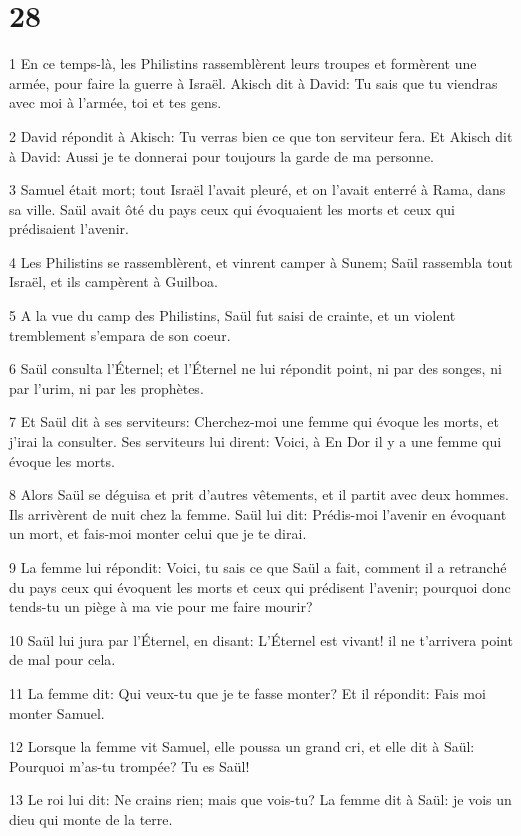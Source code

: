 \chapter{28}

\par 1 En ce temps-là, les Philistins rassemblèrent leurs troupes et formèrent une armée, pour faire la guerre à Israël. Akisch dit à David: Tu sais que tu viendras avec moi à l'armée, toi et tes gens.
\par 2 David répondit à Akisch: Tu verras bien ce que ton serviteur fera. Et Akisch dit à David: Aussi je te donnerai pour toujours la garde de ma personne.
\par 3 Samuel était mort; tout Israël l'avait pleuré, et on l'avait enterré à Rama, dans sa ville. Saül avait ôté du pays ceux qui évoquaient les morts et ceux qui prédisaient l'avenir.
\par 4 Les Philistins se rassemblèrent, et vinrent camper à Sunem; Saül rassembla tout Israël, et ils campèrent à Guilboa.
\par 5 A la vue du camp des Philistins, Saül fut saisi de crainte, et un violent tremblement s'empara de son coeur.
\par 6 Saül consulta l'Éternel; et l'Éternel ne lui répondit point, ni par des songes, ni par l'urim, ni par les prophètes.
\par 7 Et Saül dit à ses serviteurs: Cherchez-moi une femme qui évoque les morts, et j'irai la consulter. Ses serviteurs lui dirent: Voici, à En Dor il y a une femme qui évoque les morts.
\par 8 Alors Saül se déguisa et prit d'autres vêtements, et il partit avec deux hommes. Ils arrivèrent de nuit chez la femme. Saül lui dit: Prédis-moi l'avenir en évoquant un mort, et fais-moi monter celui que je te dirai.
\par 9 La femme lui répondit: Voici, tu sais ce que Saül a fait, comment il a retranché du pays ceux qui évoquent les morts et ceux qui prédisent l'avenir; pourquoi donc tends-tu un piège à ma vie pour me faire mourir?
\par 10 Saül lui jura par l'Éternel, en disant: L'Éternel est vivant! il ne t'arrivera point de mal pour cela.
\par 11 La femme dit: Qui veux-tu que je te fasse monter? Et il répondit: Fais moi monter Samuel.
\par 12 Lorsque la femme vit Samuel, elle poussa un grand cri, et elle dit à Saül: Pourquoi m'as-tu trompée? Tu es Saül!
\par 13 Le roi lui dit: Ne crains rien; mais que vois-tu? La femme dit à Saül: je vois un dieu qui monte de la terre.
